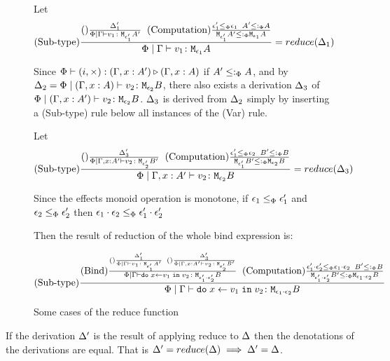\documentclass{Report}
\begin{document}
\begin{figure}
\begin{framed}
    Let \begin{equation}
        (\text{Sub-type}) \frac{
            (\text{}) \frac{\Delta'_1}{\Phi\mid\Gamma \vdash v_1 \colon \texttt{M}_{\epsilon'_1}{A'}}
        \;\;
        (\text{Computation}) \frac{ \epsilon_1'\leq_{\Phi} \epsilon_1\;\; A' \leq:_\Phi A }{\texttt{M}_{\epsilon_1'}{ A' }\leq:_\Phi\texttt{M}_{\epsilon_1}{A}}
        }{
            \Phi\mid\Gamma \vdash v_1 \colon \texttt{M}_{\epsilon_1}{A}
        } = reduce(\Delta_1)
    \end{equation}

    Since $\Phi\vdash (i,\times) : (\Gamma, x: A') \triangleright (\Gamma, x: A)$ if $A' \leq:_\Phi A$, and by $\Delta_2 = \Phi\mid(\Gamma, x: A) \vdash v_2 \colon \texttt{M}_{\epsilon_2}{B}$, there also exists a derivation $\Delta_3$ of $\Phi\mid(\Gamma, x: A') \vdash v_2 \colon \texttt{M}_{\epsilon_2}{B}$. $\Delta_3$ is derived from $\Delta_2$ simply by inserting a (Sub-type) rule below all instances of the (Var) rule.

    Let \begin{equation}
        (\text{Sub-type}) \frac{
            (\text{}) \frac{\Delta'_3}{\Phi\mid\Gamma, x: A' \vdash v_2 \colon \texttt{M}_{\epsilon'_2}{B'}}
        \;\;
        (\text{Computation}) \frac{ \epsilon_1'\leq_{\Phi} \epsilon_2\;\; B' \leq:_\Phi B }{\texttt{M}_{\epsilon_1'}{ B' }\leq:_\Phi\texttt{M}_{\epsilon_2}{B}}
        }{
            \Phi\mid\Gamma, x: A' \vdash v_2 \colon \texttt{M}_{\epsilon_2}{B}
        } = reduce(\Delta_3)
    \end{equation}
    

    Since the effects monoid operation is monotone, if $\epsilon_1\leq_{\Phi}\epsilon_1'$ and $\epsilon_2\leq_{\Phi}\epsilon_2'$ then $\epsilon_1\cdot\epsilon_2 \leq_{\Phi} \epsilon_1'\cdot\epsilon_2'$
    


    Then the result of reduction of the whole bind expression is:


    \begin{equation}
        (\text{Sub-type}) \frac{
            (\text{Bind}) \frac{
                (\text{}) \frac{
                    \Delta'_1
                }{
                    \Phi\mid\Gamma \vdash v_1 \colon \texttt{M}_{\epsilon_1'}{A'}
                }
                \;\;
                (\text{}) \frac{
                    \Delta'_3
                }{
                    \Phi\mid\Gamma, x: A' \vdash v_2 \colon \texttt{M}_{\epsilon_2'}{B'}
                }
            }{
            \Phi\mid\Gamma \vdash \texttt{do}\; x \leftarrow v_1 \;\texttt{in}\; v_2 \colon \texttt{M}_{\epsilon_1'\cdot\epsilon_2'}{B}
            }
            \;\;
            (\text{Computation}) \frac{ \epsilon_1'\cdot\epsilon_2'\leq_{\Phi} \epsilon_1\cdot\epsilon_2\;\; B' \leq:_\Phi B }{\texttt{M}_{\epsilon_1'\cdot\epsilon_2'}{ B' }\leq:_\Phi\texttt{M}_{\epsilon_1\cdot\epsilon_2}{B}}
        }{
            \Phi\mid\Gamma \vdash \texttt{do}\; x \leftarrow v_1 \;\texttt{in}\; v_2 \colon \texttt{M}_{\epsilon_1\cdot\epsilon_2}{B}
        }
    \end{equation}
    \end{framed}

    \caption{Some cases of the reduce function}
\end{figure}

\begin{theorem}
   If the derivation $\Delta'$ is the result of applying  reduce to $\Delta$ then the denotations of the derivations are equal. That is $\Delta' = reduce(\Delta) \implies \Delta' = \Delta$.
\end{theorem}
\end{document}
